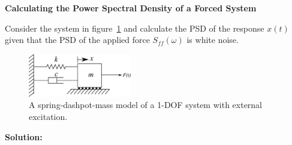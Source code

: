 \documentclass[12pt,letter]{article}
\begin{document}
\begin{example}

\textbf{Calculating the Power Spectral Density of a Forced System}

	\noindent Consider the system in figure~\ref{fig:1-DOF-spring_dashpot_mass_horizontal_forced-2} and calculate the PSD of the response $x(t)$ given that the PSD of the applied force $S_{ff}(\omega)$ is white noise.
	\begin{figure}[H]
		\centering
		\includegraphics[width=0.4\textwidth]{../figures/1-DOF-spring_dashpot_mass_horizontal_forced.png}
		\caption{A spring-dashpot-mass model of a 1-DOF system with external excitation.}
		\label{fig:1-DOF-spring_dashpot_mass_horizontal_forced-2}
	\end{figure}
	
	
	\noindent\textbf{Solution:} 


\end{example}
\end{document}
